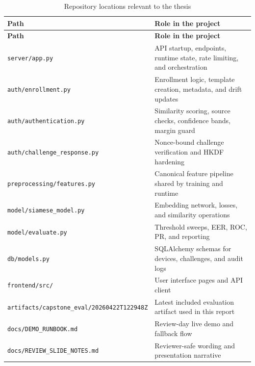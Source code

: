 \documentclass[12pt]{report}
\begin{document}
\begin{longtable}{p{}p{}}
\caption{Repository locations relevant to the thesis}\label{tab:repomap}\\
\toprule
\textbf{Path} & \textbf{Role in the project} \\
\midrule
\endfirsthead
\toprule
\textbf{Path} & \textbf{Role in the project} \\
\midrule
\endhead
\texttt{server/app.py} & API startup, endpoints, runtime state, rate limiting, and orchestration \\
\texttt{auth/enrollment.py} & Enrollment logic, template creation, metadata, and drift updates \\
\texttt{auth/authentication.py} & Similarity scoring, source checks, confidence bands, margin guard \\
\texttt{auth/challenge\_response.py} & Nonce-bound challenge verification and HKDF hardening \\
\texttt{preprocessing/features.py} & Canonical feature pipeline shared by training and runtime \\
\texttt{model/siamese\_model.py} & Embedding network, losses, and similarity operations \\
\texttt{model/evaluate.py} & Threshold sweeps, EER, ROC, PR, and reporting \\
\texttt{db/models.py} & SQLAlchemy schemas for devices, challenges, and audit logs \\
\texttt{frontend/src/} & User interface pages and API client \\
\texttt{artifacts/capstone\_eval/20260422T122948Z} & Latest included evaluation artifact used in this report \\
\texttt{docs/DEMO\_RUNBOOK.md} & Review-day live demo and fallback flow \\
\texttt{docs/REVIEW\_SLIDE\_NOTES.md} & Reviewer-safe wording and presentation narrative \\
\bottomrule
\end{longtable}
\end{document}
